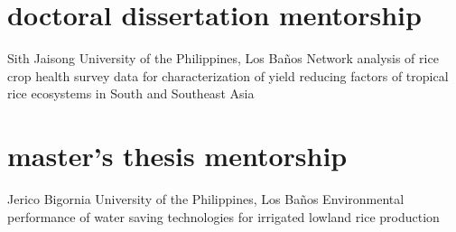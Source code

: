 \section*{doctoral dissertation mentorship}
\begin{entrylist}
    {Sith Jaisong {}}
    {University of the Philippines, Los Ba\~nos}
    {Network analysis of rice crop health survey data for characterization of yield reducing factors of tropical rice ecosystems in South and Southeast Asia}
\end{entrylist}

\section*{master's thesis mentorship}
    \begin{entrylist}
        {Jerico Bigornia {}}
        {University of the Philippines, Los Ba\~nos}
        {Environmental performance of water saving technologies for irrigated lowland rice production}
\end{entrylist}
